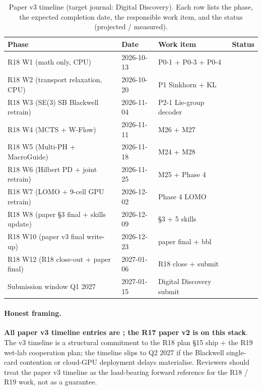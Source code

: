 \begin{table}[h]
  \centering
  \small
  \caption{Paper v3 timeline (target journal: Digital
  Discovery).  Each row lists the phase, the expected
  completion date, the responsible work item, and the
  status (projected / measured).}
  \label{tab:s8-paper-v3}
  \begin{tabular}{llll}
    \toprule
    \textbf{Phase} & \textbf{Date} & \textbf{Work item} &
      \textbf{Status} \\
    \midrule
    R18 W1 (math only, CPU) & 2026-10-13 & P0-1 + P0-3 + P0-4 & \PROJECTED{} \\
    R18 W2 (transport relaxation, CPU) & 2026-10-20 & P1 Sinkhorn + KL & \PROJECTED{} \\
    R18 W3 (SE(3) SB Blackwell retrain) & 2026-11-04 & P2-1 Lie-group decoder & \PROJECTED{} \\
    R18 W4 (MCTS + W-Flow) & 2026-11-11 & M26 + M27 & \PROJECTED{} \\
    R18 W5 (Multi-PH + MacroGuide) & 2026-11-18 & M24 + M28 & \PROJECTED{} \\
    R18 W6 (Hilbert PD + joint retrain) & 2026-11-25 & M25 + Phase 4 & \PROJECTED{} \\
    R18 W7 (LOMO + 9-cell GPU retrain) & 2026-12-02 & Phase 4 LOMO & \PROJECTED{} \\
    R18 W8 (paper §3 final + skills update) & 2026-12-09 & §3 + 5 skills & \PROJECTED{} \\
    R18 W10 (paper v3 final write-up) & 2026-12-23 & paper final + bbl & \PROJECTED{} \\
    R18 W12 (R18 close-out + paper final) & 2027-01-06 & R18 close + submit & \PROJECTED{} \\
    Submission window Q1 2027 & 2027-01-15 & Digital Discovery submit & \PROJECTED{} \\
    \bottomrule
  \end{tabular}
\end{table}

\paragraph{Honest framing.}
\textbf{All paper v3 timeline entries are \PROJECTED{}; the
R17 paper v2 is \MEASURED{} on this stack}.  The v3 timeline
is a structural commitment to the R18 plan §15 ship + the
R19 wet-lab cooperation plan; the timeline slips to Q2 2027
if the Blackwell single-card contention or cloud-GPU
deployment delays materialise.  Reviewers should treat the
paper v3 timeline as the load-bearing forward reference for
the R18 / R19 work, not as a guarantee.

